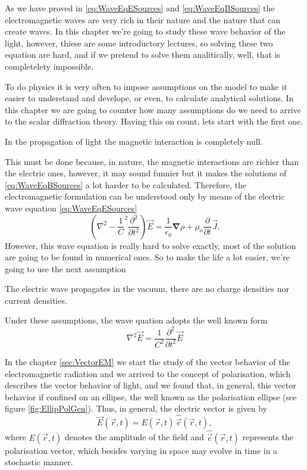 	As we have proved in \ref{eq:WaveEqESources} and \ref{eq:WaveEqBSources} the electromagnetic waves are very rich in their nature and the nature that can create waves. In this chapter we're going to study these wave behavior of the light, however, thiese are some introductory lectures, so solving these two equation are hard, and if we pretend to solve them analitically, well, that is completelety impossible.

	To do physics it is very often to impose assumptions on the model to make it easier to understand and develope, or even, to calculate analytical solutions. In this chapter we are going to counter how many assumptions do we need to arrive to the scalar diffraction theory. Having this on count, lets start with the first one.

	\begin{Assumption}
		In the propagation of light the magnetic interaction is completely null.
	\end{Assumption}

	This must be done because, in nature, the magnetic interactions are richier than the electric ones, however, it may sound funnier but it makes the solutions of \ref{eq:WaveEqBSources} a lot harder to be calculated. Therefore, the electromagnetic formulation can be understood only by means of the electric wave equation \ref{eq:WaveEqESources}
	\begin{equation*}
		\left(\nabla^2 - \frac{1}{C}^2 \frac{\partial^2}{\partial t^2}\right)\vec{E} = \frac{1}{\epsilon_0}\bm{\nabla}\rho + \mu_o \frac{\partial}{\partial t}\vec{J}.
	\end{equation*}
	However, this wave equation is really hard to solve exactly, most of the solution are going to be found in numerical ones. So to make the life a lot easier, we're going to use the next assumption
	
	\begin{Assumption}
		The electric wave propagates in the vacuum, there are no charge densities nor current densities.
	\end{Assumption}
	Under these assumptions, the wave quation adopts the well known form
	\begin{equation}
		\nabla^2 \vec{E} = \frac{1}{C^2}\frac{\partial^2}{\partial t^2}\vec{E}
	\end{equation}

	In the chapter \ref{sec:VectorEM} we start the study of the vector behavior of the electromagnetic radiation and we arrived to the concept of polarisation, which describes the vector behavior of light, and we found that, in general, this vector behavior if confined on an ellipse, the well known as the polarisation ellipse (see figure \ref{fig:EllipPolGen}). Thus, in general, the electric vector is given by
	\begin{equation}
	\vec{E}(\vec{r},t) = E(\vec{r},t) \, \hat{\vec{e}}(\vec{r},t),
	\end{equation}
	where $E(\vec{r},t)$ denotes the amplitude of the field and $\hat{\vec{e}}(\vec{r},t)$ represents the polarisation vector, which besides varying in space may evolve in time in a stochastic manner.


